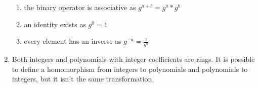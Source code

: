 \documentclass{article}
\begin{document}
\begin{enumerate}
\begin{enumerate}
        \item the binary operator is associative as $g^{a+b} = g^a * g^b$
        \item an identity exists as $g^0 = 1$
        \item every element has an inverse as $g^{-a} = \frac{1}{g^a}$
    \end{enumerate}


    \item Both integers and polynomials with integer coefficients are rings. It is possible to define a homomorphism from integers to polynomials and polynomials to integers, but it isn't the same transformation.

    
\end{enumerate}
\end{document}
